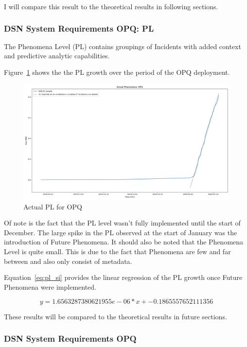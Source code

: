 I will compare this result to the theoretical results in following sections.

\subsubsection{DSN System Requirements OPQ: PL}

The Phenomena Level (PL) contains groupings of Incidents with added context and predictive analytic capabilities.

Figure~\ref{fig:actual_pl_opq} shows the the PL growth over the period of the OPQ deployment.

\begin{figure}[H]
    \centering
    \includegraphics[width=.85\linewidth]{figures/actual_phenomena_opq.png}
    \caption{Actual PL for OPQ}
    \label{fig:actual_pl_opq}
\end{figure}

Of note is the fact that the PL level wasn't fully implemented until the start of December. The large spike in the PL observed at the start of January was the introduction of Future Phenomena. It should also be noted that the Phenomena Level is quite small. This is due to the fact that Phenomena are few and far between and also only consist of metadata.

Equation~\ref{eq:pl_si} provides the linear regression of the PL growth once Future Phenomena were implemented.

\begin{equation}
    y = 1.6563287380621955e-06 * x + -0.1865557652111356
    \label{eq:pl_si}
\end{equation}

These results will be compared to the theoretical results in future sections.

\subsubsection{DSN System Requirements OPQ}

